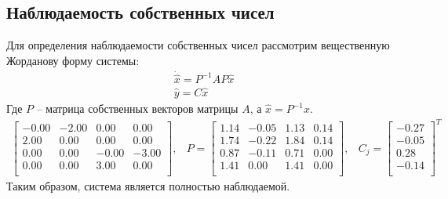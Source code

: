 \subsection{Наблюдаемость собственных чисел}
Для определения наблюдаемости собственных чисел рассмотрим вещественную Жорданову форму системы:
\begin{equation}
    \begin{array}{ll}
        \dot{\hat{x}} = P^{-1}AP\hat{x}\\
        \hat{y} = C\hat{x}
    \end{array}
\end{equation}
Где $P$ -- матрица собственных векторов матрицы $A$, а $\hat{x} = P^{-1}x$.
\begin{equation}
    \begin{array}{ccc}
        \begin{bmatrix}
            -0.00  & -2.00  & 0.00  & 0.00 \\ 
            2.00  & 0.00  & 0.00  & 0.00 \\ 
            0.00  & 0.00  & -0.00  & -3.00 \\ 
            0.00  & 0.00  & 3.00  & 0.00 \\ 
        \end{bmatrix}, &
        P = \begin{bmatrix}
            1.14  & -0.05  & 1.13  & 0.14 \\ 
            1.74  & -0.22  & 1.84  & 0.14 \\ 
            0.87  & -0.11  & 0.71  & 0.00 \\ 
            1.41  & 0.00  & 1.41  & 0.00 \\ 
        \end{bmatrix}, & 
        C_j =\begin{bmatrix}
            -0.27 \\ -0.05  \\ 0.28  \\ -0.14 \\ 
        \end{bmatrix}^T
    \end{array}
\end{equation}
Таким образом, система является полностью наблюдаемой. 

